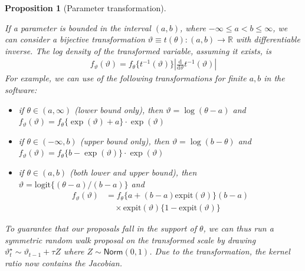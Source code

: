\documentclass[
  11pt,
  letterpaper,
]{scrbook}
\providecommand{\tightlist}{%
  \setlength{\itemsep}{0pt}\setlength{\parskip}{0pt}}\usepackage{longtable,booktabs,array}
\theoremstyle{definition}
\theoremstyle{definition}
\theoremstyle{definition}
\theoremstyle{plain}
\newtheorem{proposition}{Proposition}[chapter]
\theoremstyle{remark}
\begin{document}
\begin{proposition}[Parameter
transformation]\protect\hypertarget{prp-parameter-transformation}{}\label{prp-parameter-transformation}

If a parameter is bounded in the interval \((a,b)\), where
\(-\infty \leq a < b \leq \infty\), we can consider a bijective
transformation \(\vartheta \equiv t(\theta): (a,b) \to \mathbb{R}\) with
differentiable inverse. The log density of the transformed variable,
assuming it exists, is \begin{align*}
f_\vartheta(\vartheta) = f_{\theta}\{t^{-1}(\vartheta)\} \left| \frac{\mathrm{d}}{\mathrm{d} \vartheta} t^{-1}(\vartheta)\right|
\end{align*} For example, we can use of the following transformations
for finite \(a, b\) in the software:

\begin{itemize}
\tightlist
\item
  if \(\theta \in (a, \infty)\) (lower bound only), then
  \(\vartheta = \log(\theta-a)\) and
  \(f_{\vartheta}(\vartheta)=f_{\theta}\{\exp(\vartheta) + a\}\cdot \exp(\vartheta)\)
\item
  if \(\theta \in (-\infty, b)\) (upper bound only), then
  \(\vartheta = \log(b-\theta)\) and
  \(f_{\vartheta}(\vartheta)=f_{\theta}\{b-\exp(\vartheta)\}\cdot \exp(\vartheta)\)
\item
  if \(\theta \in (a, b)\) (both lower and upper bound), then
  \(\vartheta = \mathrm{logit}\{(\theta-a)/(b-a)\}\) and \begin{align*}
  f_{\vartheta}(\vartheta)&=f_{\theta}\{a+(b-a) \mathrm{expit}(\vartheta)\} (b-a)\\&\quad \times \mathrm{expit}(\vartheta)\{1-\mathrm{expit}(\vartheta)\}
  \end{align*}
\end{itemize}

To guarantee that our proposals fall in the support of \(\theta\), we
can thus run a symmetric random walk proposal on the \emph{transformed
scale} by drawing \(\vartheta_{t}^{\star} \sim \vartheta_{t-1}+\tau Z\)
where \(Z\sim\mathsf{Norm}(0, 1)\). Due to the transformation, the
kernel ratio now contains the Jacobian.

\end{proposition}
\end{document}
